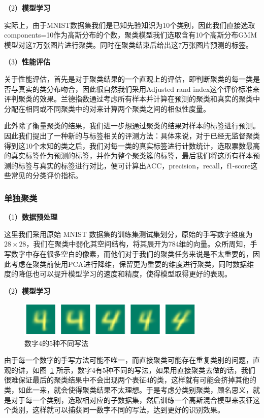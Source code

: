 \documentclass[UTF8]{ctexart}
\begin{document}
（2）\textbf{模型学习}

实际上，由于MNIST数据集我们是已知先验知识为10个类别，因此我们直接选取components=10作为高斯分布的个数，聚类模型我们选取含有10个高斯分布GMM模型对这7万张图片进行聚类。同时在聚类结束后给出这7万张图片预测的标签。

（3）\textbf{性能评估}

关于性能评估，首先是对于聚类结果的一个直观上的评估，即判断聚类的每一类是否与真实的类分布吻合，因此很自然我们采用Adjusted rand index这个评价标准来评判聚类的效果。兰德指数通过考虑所有样本并计算在预测的聚类和真实的聚类中分配在相同或不同聚类中的对来计算两个聚类之间的相似性度量。

此外除了衡量聚类的结果，我们进一步想通过聚类的结果对样本的标签进行预测。因此我们提出了一种新的与标签相关的评测方法：具体来说，对于已经无监督聚类得到这10个未知的类之后，我们对每一类的真实标签进行计数统计，选取票数最高的真实标签作为预测的标签，并作为整个聚类簇的标签，最后我们将这所有样本预测的标签与真实的标签进行对比，便可计算出ACC，precision，recall，f1-score这些常见的分类评价指标。

\subsubsection{单独聚类}

（1）\textbf{数据预处理}

这里我们采用原始 MNIST 数据集的训练集测试集划分，原始的手写数字维度为$28 \times 28$，我们在聚类中弱化其空间结构，将其展开为784维的向量。众所周知，手写数字中存在很多空白的像素，而他们对于我们的聚类任务来说是不太重要的，因此考虑在聚类前使用PCA进行降维，保留更为重要的维度进行聚类，同时数据维度的降低也可以提升模型学习的速度和精度，使得模型取得更好的表现。

（2）\textbf{模型学习}

\begin{figure}[!h]
  \includegraphics[width=0.8\textwidth]{./figures/diff4.pdf}
  \centering
  \caption{数字4的5种不同写法}\label{fig:diff4}
\end{figure}

由于每一个数字的手写方法可能不唯一，而直接聚类可能存在重复类别的问题，直观的讲，如图~\ref{fig:diff4} 所示，数字4有5种不同的写法，如果用直接聚类去做的话，我们很难保证最后的聚类结果中不会出现两个表征4的类，这样就有可能会挤掉其他的类，如此一来，就会使得聚类结果不太理想。于是考虑分类别聚类，顾名思义，就是对于每一个类别，选取相对应的子数据集，然后训练一个高斯混合模型来表征这个类别，这样就可以捕获同一数字不同的写法，达到更好的识别效果。
\end{document}
